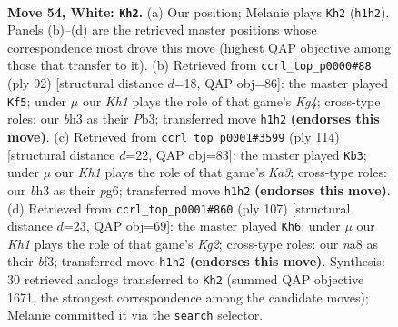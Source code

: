 \documentclass[11pt]{article}
\begin{document}
\clearpage

\begin{figure}[p]\centering
\begin{subfigure}{0.46\textwidth}\centering
\resizebox{\linewidth}{!}{%
\newchessgame
\chessboard[
  setfen={n6Q/8/8/1p4k1/7p/P2P3b/8/4q2K w - - 0 54},
  showmover=false,
  pgfstyle=straightmove, color=movearrow, markmove={h1-h2}
]}
\caption{}
\end{subfigure}\hfill
\begin{subfigure}{0.46\textwidth}\centering
\resizebox{\linewidth}{!}{%
\newchessgame
\chessboard[
  setfen={8/1Q4pk/p7/P7/6K1/1PP5/8/6q1 w - - 1 47},
  showmover=false,
  pgfstyle=straightmove, color=movearrow, markmove={g4-f5}
]}
\caption{}
\end{subfigure}
\\[4pt]
\begin{subfigure}{0.46\textwidth}\centering
\resizebox{\linewidth}{!}{%
\newchessgame
\chessboard[
  setfen={6k1/5p2/3q2p1/P7/2Q5/K7/8/8 w - - 11 58},
  showmover=false,
  pgfstyle=straightmove, color=movearrow, markmove={a3-b3}
]}
\caption{}
\end{subfigure}\hfill
\begin{subfigure}{0.46\textwidth}\centering
\resizebox{\linewidth}{!}{%
\newchessgame
\chessboard[
  setfen={8/3Q2k1/6p1/4b3/1P5p/q4B1P/4K3/8 b - - 1 54},
  showmover=false,
  pgfstyle=straightmove, color=movearrow, markmove={g7-h6}
]}
\caption{}
\end{subfigure}
\caption{\textbf{Move 54, White: \texttt{Kh2}.} (a) Our position; Melanie plays \texttt{Kh2} (\texttt{h1h2}). Panels (b)--(d) are the retrieved master positions whose correspondence most drove this move (highest QAP objective among those that transfer to it). (b) Retrieved from \texttt{ccrl\_top\_p0000\#88} (ply 92) [structural distance $d$=18, QAP obj=86]: the master played \texttt{Kf5}; under $\mu$ our \emph{Kh1} plays the role of that game's \emph{Kg4}; cross-type roles: our \emph{b}h3 as their \emph{P}b3; transferred move \texttt{h1h2} \textbf{(endorses this move)}. (c) Retrieved from \texttt{ccrl\_top\_p0001\#3599} (ply 114) [structural distance $d$=22, QAP obj=83]: the master played \texttt{Kb3}; under $\mu$ our \emph{Kh1} plays the role of that game's \emph{Ka3}; cross-type roles: our \emph{b}h3 as their \emph{p}g6; transferred move \texttt{h1h2} \textbf{(endorses this move)}. (d) Retrieved from \texttt{ccrl\_top\_p0001\#860} (ply 107) [structural distance $d$=23, QAP obj=69]: the master played \texttt{Kh6}; under $\mu$ our \emph{Kh1} plays the role of that game's \emph{Kg2}; cross-type roles: our \emph{n}a8 as their \emph{b}f3; transferred move \texttt{h1h2} \textbf{(endorses this move)}. Synthesis: 30 retrieved analogs transferred to \texttt{Kh2} (summed QAP objective 1671, the strongest correspondence among the candidate moves); Melanie committed it via the \texttt{search} selector.}
\label{fig:thought-m106}
\end{figure}
\end{document}

